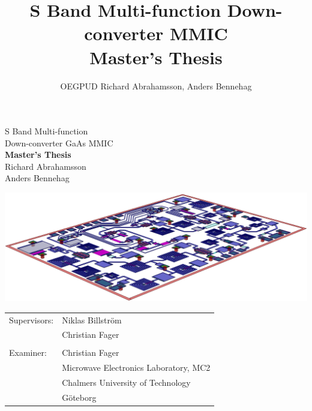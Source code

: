\title{S Band Multi-function Down-converter MMIC \\ Master's Thesis}
\author{OEGPUD Richard Abrahamsson, Anders Bennehag}
\date{\mytoday}
\documentreference{}
	
\begin{center}
\vspace*{25pt}
{\Huge S Band Multi-function \\
\vspace*{5pt}
Down-converter GaAs MMIC} \\
\vspace{40pt}
{\Large \textbf{Master's Thesis} \\
Richard Abrahamsson \\
\vspace{2pt}
Anders Bennehag} \\
\vspace{30pt}

\vspace{40pt}
\includegraphics[width=1.0\textwidth]{fig/front_v3}

\vfill
\begin{tabular}{ll}
	Supervisors: & Niklas Billström \\
				 & Christian Fager \\
				 & \\
	Examiner:	 & Christian Fager \\
				 & Microwave Electronics Laboratory, MC2 \\
				 & Chalmers University of Technology \\
				 & Göteborg
\end{tabular}
\end{center}


